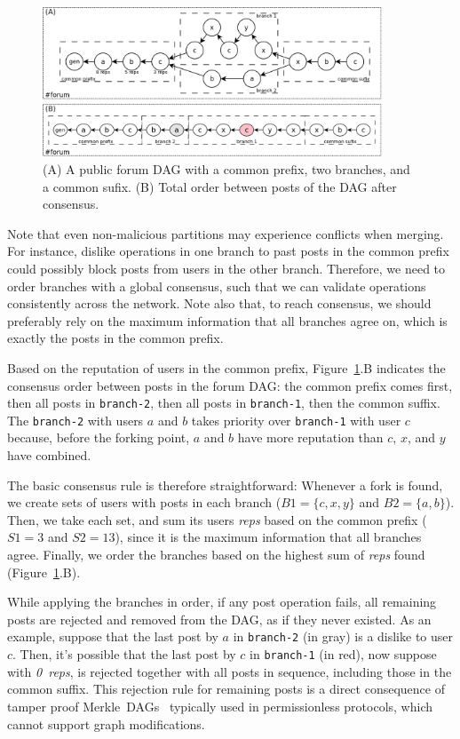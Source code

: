 \documentclass[12pt]{article}
\newcommand{\reps}     {\emph{reps}\xspace}
\newcommand{\nreps}[1] {\emph{#1~reps\xspace}}
\newcommand{\code}[1]  {\texttt{\footnotesize{#1}}}
\begin{document}
\begin{figure}
\centering
\includegraphics[width=0.9\textwidth]{reps.png}
\caption{
    (A) A public forum DAG with a common prefix, two branches, and a common sufix.
    (B) Total order between posts of the DAG after consensus.
}
\label{fig.reps}
\end{figure}

Note that even non-malicious partitions may experience conflicts when
merging.
For instance, dislike operations in one branch to past posts in the common
prefix could possibly block posts from users in the other branch.
Therefore, we need to order branches with a global consensus, such that we can
validate operations consistently across the network.
%
Note also that, to reach consensus, we should preferably rely on the maximum
information that all branches agree on, which is exactly the posts in the
common prefix.

Based on the reputation of users in the common prefix, Figure~\ref{fig.reps}.B
indicates the consensus order between posts in the forum DAG:
    the common prefix comes first,
    then all posts in \code{branch-2},
    then all posts in \code{branch-1},
    then the common suffix.
%
The \code{branch-2} with users $a$ and $b$ takes priority over \code{branch-1}
with user $c$ because, before the forking point, $a$ and $b$ have more
reputation than $c$, $x$, and $y$ have combined.

The basic consensus rule is therefore straightforward:
Whenever a fork is found, we create sets of users with posts in each branch
($B1=\{c,x,y\}$ and $B2=\{a,b\}$).
Then, we take each set, and sum its users \reps based on the common prefix
($S1=3$ and $S2=13$), since it is the maximum information that all branches
agree.
Finally, we order the branches based on the highest sum of \reps found
(Figure~\ref{fig.reps}.B).

While applying the branches in order, if any post operation fails, all
remaining posts are rejected and removed from the DAG, as if they never
existed.
As an example, suppose that the last post by $a$ in \code{branch-2} (in gray)
is a dislike to user $c$.
Then, it's possible that the last post by $c$ in \code{branch-1} (in red), now
suppose with \nreps{0}, is rejected together with all posts in sequence,
including those in the common suffix.
%
This rejection rule for remaining posts is a direct consequence of tamper proof
Merkle~DAGs~\cite{p2p.ipfs,p2p.bitcoin} typically used in permissionless
protocols, which cannot support graph modifications.
\end{document}
